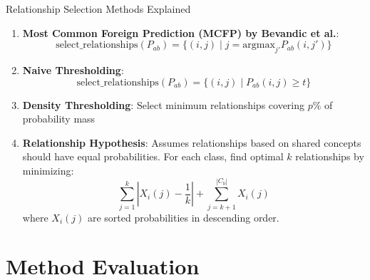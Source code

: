 \documentclass[aspectratio=169]{beamer}
\begin{document}
\begin{frame}{Relationship Selection Methods Explained}
    \begin{enumerate}
        \item \textbf{Most Common Foreign Prediction (MCFP) by Bevandic et al.}:
              \begin{equation}
                  \text{select\_relationships}(P_{ab}) = \{(i, j) \mid j = \text{argmax}_{j'} P_{ab}(i, j')\}
              \end{equation}

        \item \textbf{Naive Thresholding}:
              \begin{equation}
                  \text{select\_relationships}(P_{ab}) = \{(i, j) \mid P_{ab}(i, j) \geq t\}
              \end{equation}

        \item \textbf{Density Thresholding}: Select minimum relationships covering $p\%$ of probability mass

        \item \textbf{Relationship Hypothesis}: Assumes relationships based on shared concepts should have equal probabilities. For each class, find optimal $k$ relationships by minimizing:
              \begin{equation}
                  \sum_{j=1}^k \left| X_i(j) - \frac{1}{k} \right| + \sum_{j=k+1}^{|C_b|} X_i(j)
              \end{equation}
              where $X_i(j)$ are sorted probabilities in descending order.
    \end{enumerate}
\end{frame}

\section{Method Evaluation}
\end{document}
